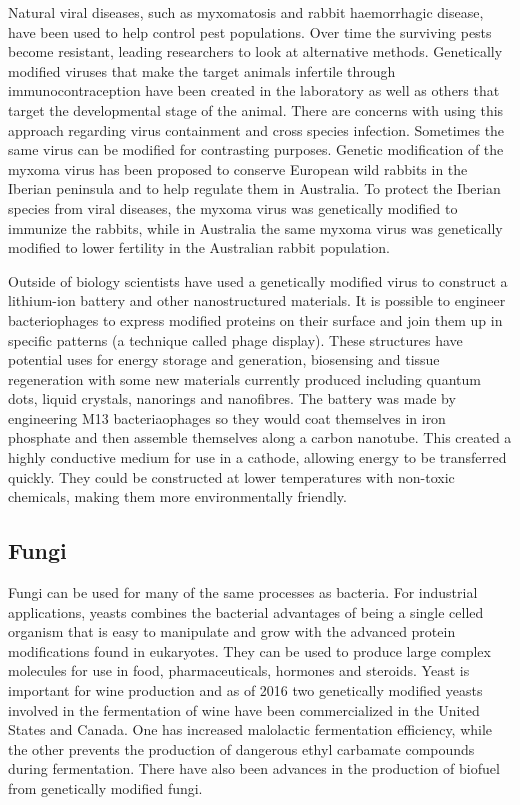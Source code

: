 Natural viral diseases, such as myxomatosis and rabbit haemorrhagic disease, have been used to help control pest populations. Over time the surviving pests become resistant, leading researchers to look at alternative methods. Genetically modified viruses that make the target animals infertile through immunocontraception have been created in the laboratory as well as others that target the developmental stage of the animal. There are concerns with using this approach regarding virus containment and cross species infection. Sometimes the same virus can be modified for contrasting purposes. Genetic modification of the myxoma virus has been proposed to conserve European wild rabbits in the Iberian peninsula and to help regulate them in Australia. To protect the Iberian species from viral diseases, the myxoma virus was genetically modified to immunize the rabbits, while in Australia the same myxoma virus was genetically modified to lower fertility in the Australian rabbit population.

Outside of biology scientists have used a genetically modified virus to construct a lithium-ion battery and other nanostructured materials. It is possible to engineer bacteriophages to express modified proteins on their surface and join them up in specific patterns (a technique called phage display). These structures have potential uses for energy storage and generation, biosensing and tissue regeneration with some new materials currently produced including quantum dots, liquid crystals, nanorings and nanofibres. The battery was made by engineering M13 bacteriaophages so they would coat themselves in iron phosphate and then assemble themselves along a carbon nanotube. This created a highly conductive medium for use in a cathode, allowing energy to be transferred quickly. They could be constructed at lower temperatures with non-toxic chemicals, making them more environmentally friendly.

\hypertarget{fungi}{%
\subsection{Fungi}\label{fungi}}

Fungi can be used for many of the same processes as bacteria. For industrial applications, yeasts combines the bacterial advantages of being a single celled organism that is easy to manipulate and grow with the advanced protein modifications found in eukaryotes. They can be used to produce large complex molecules for use in food, pharmaceuticals, hormones and steroids. Yeast is important for wine production and as of 2016 two genetically modified yeasts involved in the fermentation of wine have been commercialized in the United States and Canada. One has increased malolactic fermentation efficiency, while the other prevents the production of dangerous ethyl carbamate compounds during fermentation. There have also been advances in the production of biofuel from genetically modified fungi.

